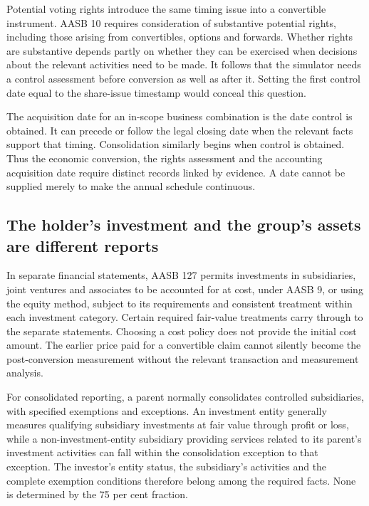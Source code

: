 Potential voting rights introduce the same timing issue into a convertible instrument. AASB 10 requires consideration of substantive potential rights, including those arising from convertibles, options and forwards. Whether rights are substantive depends partly on whether they can be exercised when decisions about the relevant activities need to be made.\citep[paras.~B24, B47--B50]{aasb10control2026} It follows that the simulator needs a control assessment before conversion as well as after it. Setting the first control date equal to the share-issue timestamp would conceal this question.

The acquisition date for an in-scope business combination is the date control is obtained. It can precede or follow the legal closing date when the relevant facts support that timing. Consolidation similarly begins when control is obtained.\citep[para.~20]{aasb10control2026}\citep[paras.~8--9]{aasb3scope2026} Thus the economic conversion, the rights assessment and the accounting acquisition date require distinct records linked by evidence. A date cannot be supplied merely to make the annual schedule continuous.

\subsection{The holder's investment and the group's assets are different reports}

In separate financial statements, AASB 127 permits investments in subsidiaries, joint ventures and associates to be accounted for at cost, under AASB 9, or using the equity method, subject to its requirements and consistent treatment within each investment category. Certain required fair-value treatments carry through to the separate statements.\citep[paras.~3--10, 11A]{aasb127scope2022} Choosing a cost policy does not provide the initial cost amount. The earlier price paid for a convertible claim cannot silently become the post-conversion measurement without the relevant transaction and measurement analysis.

For consolidated reporting, a parent normally consolidates controlled subsidiaries, with specified exemptions and exceptions. An investment entity generally measures qualifying subsidiary investments at fair value through profit or loss, while a non-investment-entity subsidiary providing services related to its parent's investment activities can fall within the consolidation exception to that exception.\citep[paras.~4--4B, 27--33]{aasb10control2026} The investor's entity status, the subsidiary's activities and the complete exemption conditions therefore belong among the required facts. None is determined by the 75 per cent fraction.

